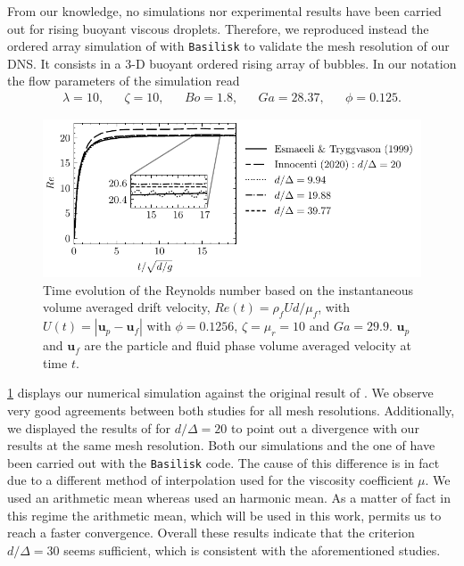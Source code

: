 From our knowledge, no simulations nor experimental results have been carried out for rising buoyant viscous droplets. 
Therefore, we reproduced instead the ordered array simulation of \citet{esmaeeli1999direct} with \texttt{Basilisk} to validate the mesh resolution of our DNS.  
It consists in a 3-D buoyant ordered rising array of bubbles. 
In our notation the flow parameters of the simulation read 
\begin{align*}
    \lambda = 10,
    && \zeta = 10,
    && Bo = 1.8,
    && Ga = 28.37,
    && \phi = 0.125.
\end{align*}
\begin{figure}[h!]
    \centering
    \includegraphics[height = 0.3\textwidth]{image/VALIDATION2.0/Loisy/Re.pdf}
    \caption{Time evolution of the Reynolds number based on the instantaneous volume averaged drift velocity, $Re(t) = \rho_fU d /\mu_f$, with $U(t) = |\textbf{u}_p - \textbf{u}_f|$ with $\phi = 0.1256$, $\zeta =\mu_r =10$ and $Ga = 29.9$.
    $\textbf{u}_p$ and $\textbf{u}_f$ are the particle and fluid phase volume averaged velocity at time $t$.}
    \label{fig:ordered_array}
\end{figure}
\ref{fig:ordered_array} displays our numerical simulation against the original result of \citet{esmaeeli1999direct}.
We observe very good agreements between both studies for all mesh resolutions.
Additionally, we displayed the results of \citet{innocenti2020direct} for $d/\Delta = 20$ to point out a divergence with our results at the same mesh resolution.  
Both our simulations and the one of \citet{innocenti2020direct} have been carried out with the  \texttt{Basilisk} code. 
The cause of this difference is in fact due to a different method of interpolation used for the viscosity coefficient $\mu$. 
We used an arithmetic mean whereas \citet{innocenti2020direct} used an 
harmonic mean.
As a matter of fact in this regime the arithmetic mean, which will be used in this work, permits us to reach a faster convergence. 
Overall these results indicate that the criterion $d/\Delta = 30$ seems sufficient, which is consistent with the aforementioned studies.



